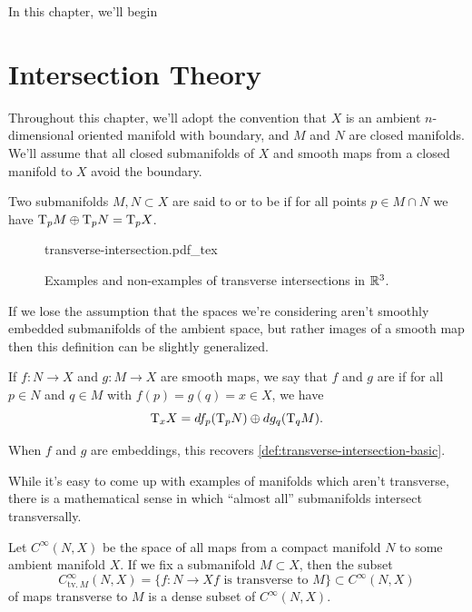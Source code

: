 In this chapter, we'll begin


\section{Intersection Theory}

Throughout this chapter, we'll adopt the convention that $X$ is an ambient $n$-dimensional oriented manifold with boundary, and $M$ and $N$ are closed manifolds. We'll assume that all closed submanifolds of $X$ and smooth maps from a closed manifold to $X$ avoid the boundary.

\begin{definition}\label{def:transverse-intersection-basic}
	Two submanifolds $M,N\subset X$ are said to  or to be  if for all points $p\in M\cap N$ we have $\mathrm{T}_p M\oplus \mathrm{T}_p N = \mathrm{T}_p X$.
\end{definition}

\begin{figure}[ht]
	\centering
	{transverse-intersection.pdf_tex}
	\medskip
	\caption{Examples and non-examples of transverse intersections in $\mathbb{R}^3$.}\label{fig:transverse-intersection}
\end{figure}

If we lose the assumption that the spaces we're considering aren't smoothly embedded submanifolds of the ambient space, but rather images of a smooth map then this definition can be slightly generalized.

\begin{definition}\label{def:transverse-intersection}
	If $f : N \to X$ and $g : M \to X$ are smooth maps, we say that $f$ and $g$ are  if for all $p\in N$ and $q\in M$ with $f(p)=g(q)=x\in X$, we have
	\[
		\mathrm{T}_x X = df_p(\mathrm{T}_p N) \oplus dg_q(\mathrm{T}_q M).
	\]
\end{definition}

\begin{remark}
	When $f$ and $g$ are embeddings, this recovers \cref{def:transverse-intersection-basic}.
\end{remark}

While it's easy to come up with examples of manifolds which aren't transverse, there is a mathematical sense in which ``almost all'' submanifolds intersect transversally.

\begin{theorem}
	Let $C^\infty(N,X)$ be the space of all maps from a compact manifold $N$ to some ambient manifold $X$. If we fix a submanifold $M\subset X$, then the subset
	\[
		C^\infty_{\mathrm{tv.}\,M}(N,X)=\{ f : N \to X  f\textrm{ is transverse to } M\}\subset C^\infty(N,X)
	\]
	of maps transverse to $M$ is a dense subset of $C^\infty(N,X)$.
\end{theorem}

